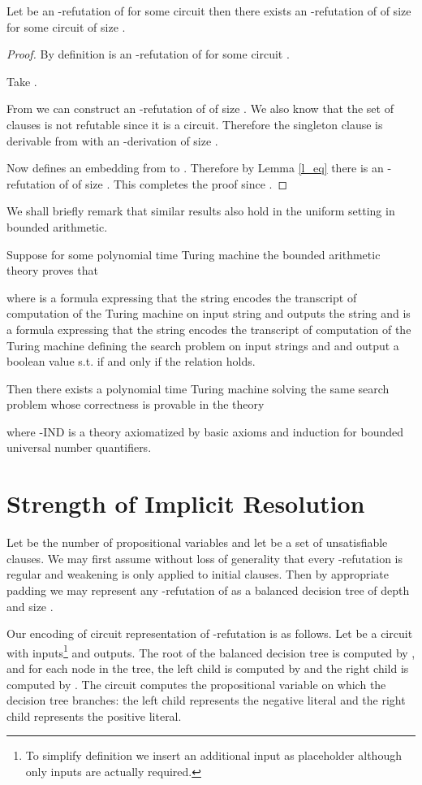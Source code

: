 \documentclass{LMCS}
\theoremstyle{plain}\newtheorem{satz}[thm]{Satz}
\begin{document}
\begin{lem}
\label{t_c}
Let  be an -refutation of  for some circuit  then there exists an -refutation of  of size  for some circuit  of size .
\end{lem}
\begin{proof}
By definition  is an -refutation of  for some circuit .

Take .

From  we can construct an -refutation of  of size . We also know that the set of clauses  is not refutable since it is a circuit. Therefore the singleton clause  is derivable from  with an -derivation of size .

Now  defines an embedding from  to . Therefore by Lemma \ref{l_eq} there is an -refutation of  of size . This completes the proof since .
\end{proof}

We shall briefly remark that similar results also hold in the uniform setting in bounded arithmetic.

Suppose for some polynomial time Turing machine  the bounded arithmetic theory  proves that

where  is a formula expressing that the string  encodes the transcript of computation of the Turing machine  on input string  and  outputs the string  and  is a formula expressing that the string  encodes the transcript of computation of the Turing machine  defining the  search problem on input strings  and  and output a boolean value  s.t.  if and only if the relation  holds.

Then there exists a polynomial time Turing machine  solving the same  search problem whose correctness is provable in the theory 

where -IND is a theory axiomatized by basic axioms and induction for bounded universal number quantifiers.

\section{Strength of Implicit Resolution}
\label{s_ires}
Let  be the number of propositional variables and let  be a set of unsatisfiable clauses. We may first assume without loss of generality that every -refutation is regular and weakening is only applied to initial clauses. Then by appropriate padding we may represent any -refutation of  as a balanced decision tree of depth  and size .

Our encoding of circuit representation of -refutation is as follows. Let  be a circuit with  inputs\footnote{To simplify definition we insert an additional input as placeholder although only  inputs are actually required.} and  outputs. The root of the balanced decision tree is computed by , and for each node  in the tree, the left child is computed by  and the right child is computed by . The circuit computes the propositional variable on which the decision tree branches: the left child represents the negative literal and the right child represents the positive literal.
\end{document}
